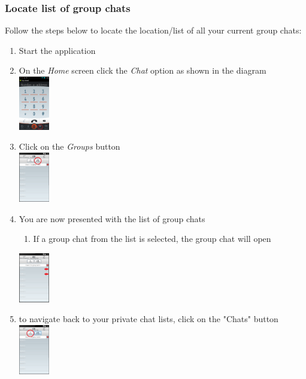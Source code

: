\documentclass[11pt]{article}
\begin{document}
\subsubsection{Locate list of group chats} \label{locate}
Follow the steps below to locate the location/list of all your current group chats:
\begin{enumerate}
\item Start the application
\item On the \textit{Home} screen click the \textit{Chat} option as shown in the diagram\\
\includegraphics[width=50px]{images/mainScreen.png}
\item Click on the \textit{Groups} button\\

\includegraphics[width=50px]{images/ChatlistNav.png}
\item You are now presented with the list of group chats
\begin{enumerate}
\item If a group chat from the list is selected, the group chat will open\\
\end{enumerate}
\includegraphics[width=50px]{images/Grouplist.png}
\item to navigate back to your private chat lists, click on the "Chats" button\\
\includegraphics[width=50px]{images/GrouplistNav.png}
\end{enumerate}
\end{document}
